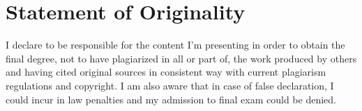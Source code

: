 \documentclass[11pt, draft]{article}
\begin{document}

\newpage

\vfill
\section*{Statement of Originality}
I declare to be responsible for the content I’m presenting in order to obtain the final degree, not to have plagiarized in all or part of, the work produced by others and having cited original sources in consistent way with current plagiarism regulations and copyright. I am also aware that in case of false declaration, I could incur in law penalties and my admission to final exam could be denied.
\newpage



\newpage


\newpage

\tableofcontents
\listoftables
\listoffigures
\newpage

\pagestyle{fancy}












\end{document}
